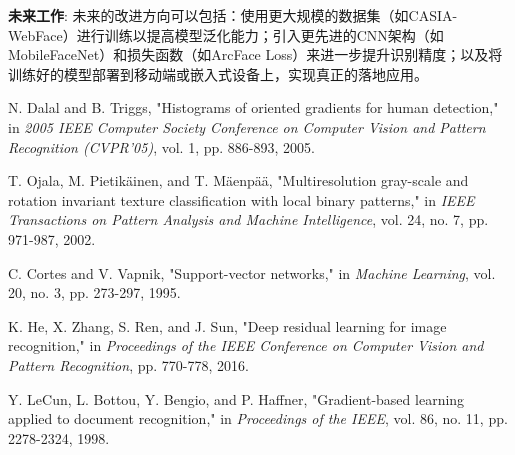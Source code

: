 \documentclass[a4paper]{article}
\begin{document}
\textbf{未来工作}:
未来的改进方向可以包括：使用更大规模的数据集（如CASIA-WebFace）进行训练以提高模型泛化能力；引入更先进的CNN架构（如MobileFaceNet）和损失函数（如ArcFace Loss）来进一步提升识别精度；以及将训练好的模型部署到移动端或嵌入式设备上，实现真正的落地应用。

\begin{thebibliography}{9}
    N. Dalal and B. Triggs, "Histograms of oriented gradients for human detection," in \textit{2005 IEEE Computer Society Conference on Computer Vision and Pattern Recognition (CVPR'05)}, vol. 1, pp. 886-893, 2005.
    
    T. Ojala, M. Pietikäinen, and T. Mäenpää, "Multiresolution gray-scale and rotation invariant texture classification with local binary patterns," in \textit{IEEE Transactions on Pattern Analysis and Machine Intelligence}, vol. 24, no. 7, pp. 971-987, 2002.
    
    C. Cortes and V. Vapnik, "Support-vector networks," in \textit{Machine Learning}, vol. 20, no. 3, pp. 273-297, 1995.
    
    K. He, X. Zhang, S. Ren, and J. Sun, "Deep residual learning for image recognition," in \textit{Proceedings of the IEEE Conference on Computer Vision and Pattern Recognition}, pp. 770-778, 2016.
    
    Y. LeCun, L. Bottou, Y. Bengio, and P. Haffner, "Gradient-based learning applied to document recognition," in \textit{Proceedings of the IEEE}, vol. 86, no. 11, pp. 2278-2324, 1998.
\end{thebibliography}
\end{document}
